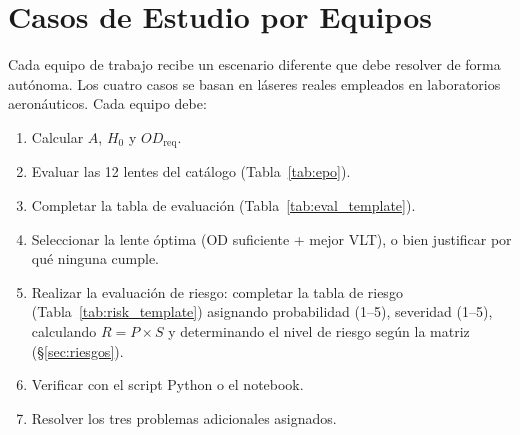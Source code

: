 \documentclass[12pt,a4paper]{article}
\begin{document}
\section{Casos de Estudio por Equipos}
\label{sec:equipos}

Cada equipo de trabajo recibe un escenario diferente que debe resolver de forma
autónoma. Los cuatro casos se basan en láseres reales empleados en laboratorios
aeronáuticos. Cada equipo debe:
\begin{enumerate}
	\item Calcular $A$, $H_0$ y $OD_{\mathrm{req}}$.
	\item Evaluar las 12 lentes del catálogo (Tabla~\ref{tab:epo}).
	\item Completar la tabla de evaluación (Tabla~\ref{tab:eval_template}).
	\item Seleccionar la lente óptima (OD suficiente + mejor VLT), o bien
	      justificar por qué ninguna cumple.
	\item Realizar la evaluación de riesgo: completar la tabla de riesgo
	      (Tabla~\ref{tab:risk_template}) asignando probabilidad (1--5),
	      severidad (1--5), calculando $R = P \times S$ y determinando el
	      nivel de riesgo según la matriz (§\ref{sec:riesgos}).
	\item Verificar con el script Python o el notebook.
	\item Resolver los tres problemas adicionales asignados.
\end{enumerate}
\end{document}
